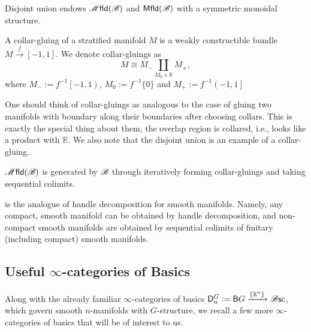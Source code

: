 \documentclass[../text]{subfiles}
\begin{document}
\begin{proposition}
    Disjoint union endows $\mfld(\bstr)$ and $\mfld[r](\bstr)$ with a symmetric monoidal structure.
\end{proposition}

\begin{definition}\label{def:collar-gluing}
    A collar-gluing of a stratified manifold $M$ is a weakly constructible bundle $M \xrightarrow{f} [-1,1]$. We denote collar-gluings as
    \begin{equation}
        M \cong M_- \coprod_{M_0 \times \mathbb{R}} M_+,
    \end{equation}
    where $M_- := f^{-1}\left[ -1, 1 \right)$, $M_0 := f^{-1}\{0\}$ and $M_+ := f^{-1} \left( -1, 1 \right]$
\end{definition}

\begin{remark}
    One should think of collar-gluings as analogous to the case of gluing two manifolds with boundary along their boundaries after choosing collars. This is exactly the special thing about them, the overlap region is collared, i.e., looks like a product with $\mathbb{R}$. We also note that the disjoint union is an example of a collar-gluing.
\end{remark}

\begin{theorem}\label{thm:decom_strat_man}
    $\mfld(\bstr)$ is generated by $\mathscr{B}$ through iteratively forming collar-gluings and taking sequential colimits.
\end{theorem}

\begin{remark}
     is the analogue of handle decomposition for smooth manifolds. Namely, any compact, smooth manifold can be obtained by handle decomposition, and non-compact smooth manifolds are obtained by sequential colimits of finitary (including compact) smooth manifolds.
\end{remark}




\subsection{Useful \texorpdfstring{$\infty$}{infinite}-categories of Basics}

Along with the already familiar $\infty$-categories of basics $\mathsf{D}_n^{G} := \mathsf{B}G \xrightarrow{\{ \mathbb{R}^n\}} \mathscr{B} \mathsf{sc}$, which govern smooth $n$-manifolds with $G$-structure, we recall a few more $\infty$-categories of basics that will be of interest to us. 
\end{document}

